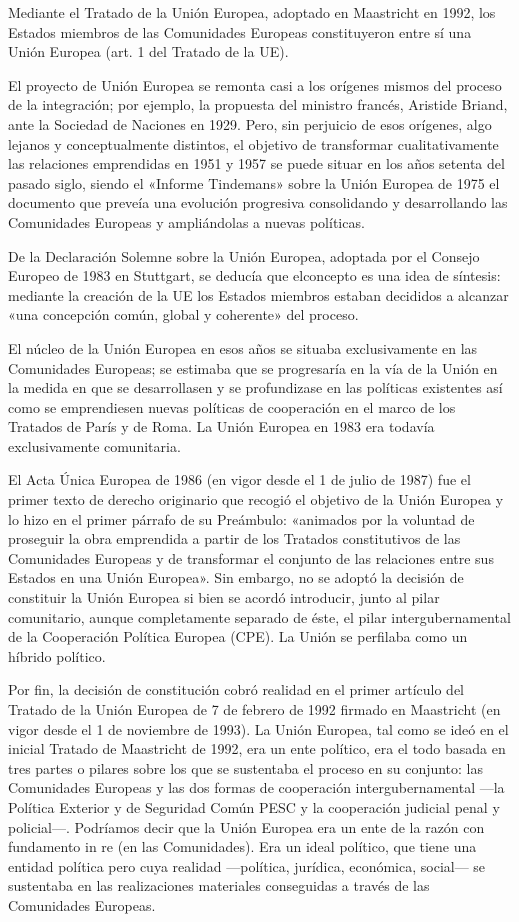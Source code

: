 \documentclass[10pt,a4paper]{article}
\begin{document}
Mediante el Tratado de la Unión Europea, adoptado en Maastricht en 1992, los Estados miembros de las Comunidades Europeas constituyeron entre sí una Unión Europea (art. 1 del Tratado de la UE).

El proyecto de Unión Europea se remonta casi a los orígenes mismos del proceso de la integración; por ejemplo, la propuesta del ministro francés, Aristide Briand, ante la Sociedad de Naciones en 1929. Pero, sin perjuicio de esos orígenes, algo lejanos y conceptualmente distintos, el objetivo de transformar cualitativamente las relaciones emprendidas en 1951 y 1957 se puede situar en los años setenta del pasado siglo, siendo el «Informe Tindemans» sobre la Unión Europea de 1975 el documento que preveía una evolución progresiva consolidando y desarrollando las Comunidades Europeas y ampliándolas a nuevas políticas.

De la Declaración Solemne sobre la Unión Europea, adoptada por el Consejo Europeo de 1983 en Stuttgart, se deducía que elconcepto es una idea de síntesis: mediante la creación de la UE los Estados miembros estaban decididos a alcanzar «una concepción común, global y coherente» del proceso.

El núcleo de la Unión Europea en esos años se situaba exclusivamente en las Comunidades Europeas; se estimaba que se progresaría en la vía de la Unión en la medida en que se desarrollasen y se profundizase en las políticas existentes así como se emprendiesen nuevas políticas de cooperación en el marco de los Tratados de París y de Roma. La Unión Europea en 1983 era
todavía exclusivamente comunitaria.

El Acta Única Europea de 1986 (en vigor desde el 1 de julio de 1987) fue el primer texto de derecho originario que recogió el objetivo de la Unión Europea y lo hizo en el primer párrafo de su Preámbulo: «animados por la voluntad de proseguir la obra emprendida a partir de los Tratados constitutivos de las Comunidades Europeas y de transformar el conjunto de las relaciones entre sus Estados en una Unión Europea». Sin embargo, no se adoptó la decisión de constituir la Unión Europea si bien se acordó introducir, junto al pilar comunitario, aunque completamente separado de éste, el pilar intergubernamental de la Cooperación Política Europea (CPE). La Unión se perfilaba como un híbrido político.

Por fin, la decisión de constitución cobró realidad en el primer artículo del Tratado de la Unión Europea de 7 de febrero de 1992 firmado en Maastricht (en vigor desde el 1 de noviembre de 1993). La Unión Europea, tal como se ideó en el inicial Tratado de Maastricht de 1992, era un ente político, era el todo basada en tres partes o pilares sobre los que se sustentaba el proceso en su conjunto: las Comunidades Europeas y las dos formas de cooperación intergubernamental —la Política Exterior y de Seguridad Común PESC y la cooperación judicial penal y policial—. Podríamos decir que la Unión Europea era un ente de la razón con fundamento in re (en las Comunidades). Era un ideal político, que tiene una entidad política pero cuya realidad —política, jurídica, económica, social— se sustentaba en las realizaciones materiales conseguidas a través de las Comunidades Europeas.
\end{document}
